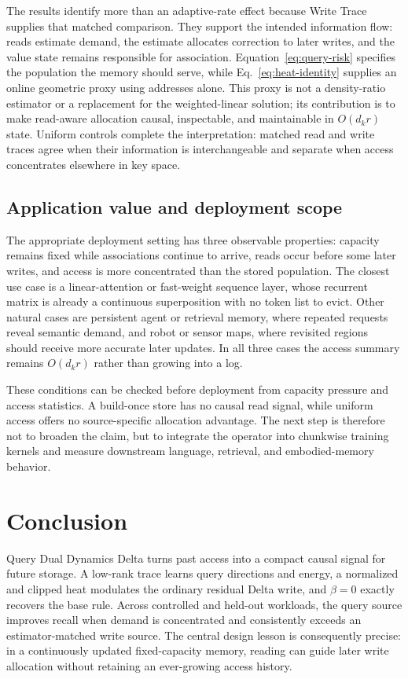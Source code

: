 \documentclass[pdflatex,sn-mathphys-num]{sn-jnl}
\theoremstyle{thmstyleone}
\begin{document}
The results identify more than an adaptive-rate effect because Write Trace supplies that matched comparison. They support the intended information flow: reads estimate demand, the estimate allocates correction to later writes, and the value state remains responsible for association. Equation~\eqref{eq:query-risk} specifies the population the memory should serve, while Eq.~\eqref{eq:heat-identity} supplies an online geometric proxy using addresses alone. This proxy is not a density-ratio estimator or a replacement for the weighted-linear solution; its contribution is to make read-aware allocation causal, inspectable, and maintainable in $O(d_kr)$ state. Uniform controls complete the interpretation: matched read and write traces agree when their information is interchangeable and separate when access concentrates elsewhere in key space.

\subsection{Application value and deployment scope}

The appropriate deployment setting has three observable properties: capacity remains fixed while associations continue to arrive, reads occur before some later writes, and access is more concentrated than the stored population. The closest use case is a linear-attention or fast-weight sequence layer, whose recurrent matrix is already a continuous superposition with no token list to evict. Other natural cases are persistent agent or retrieval memory, where repeated requests reveal semantic demand, and robot or sensor maps, where revisited regions should receive more accurate later updates. In all three cases the access summary remains $O(d_kr)$ rather than growing into a log.

These conditions can be checked before deployment from capacity pressure and access statistics. A build-once store has no causal read signal, while uniform access offers no source-specific allocation advantage. The next step is therefore not to broaden the claim, but to integrate the operator into chunkwise training kernels and measure downstream language, retrieval, and embodied-memory behavior.

\section{Conclusion}\label{sec:conclusion}

Query Dual Dynamics Delta turns past access into a compact causal signal for future storage. A low-rank trace learns query directions and energy, a normalized and clipped heat modulates the ordinary residual Delta write, and $\beta=0$ exactly recovers the base rule. Across controlled and held-out workloads, the query source improves recall when demand is concentrated and consistently exceeds an estimator-matched write source. The central design lesson is consequently precise: in a continuously updated fixed-capacity memory, reading can guide later write allocation without retaining an ever-growing access history.
\end{document}
